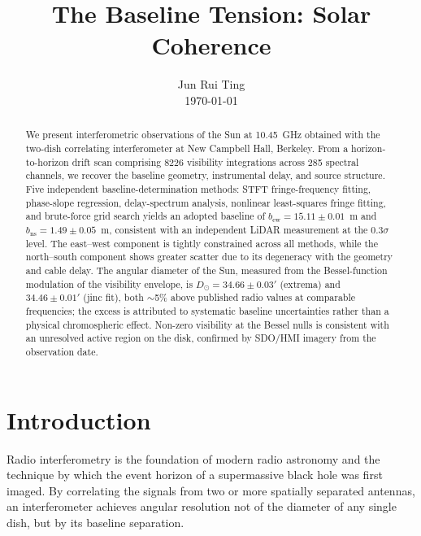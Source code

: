 \documentclass[10pt,preprint2]{aastex}
\begin{document}
\title{The Baseline Tension: Solar Coherence}
\author{Jun Rui Ting \\ \today\vspace{-2.5\baselineskip}}

\begin{abstract}
We present interferometric observations of the Sun at 10.45~GHz obtained with the two-dish correlating interferometer at New Campbell Hall, Berkeley. From a horizon-to-horizon drift scan comprising 8226 visibility integrations across 285 spectral channels, we recover the baseline geometry, instrumental delay, and source structure. Five independent baseline-determination methods: STFT fringe-frequency fitting, phase-slope regression, delay-spectrum analysis, nonlinear least-squares fringe fitting, and brute-force grid search yields an adopted baseline of $b_{\mathrm{ew}} = 15.11 \pm 0.01$~m and $b_{\mathrm{ns}} = 1.49 \pm 0.05$~m, consistent with an independent LiDAR measurement at the $0.3\sigma$ level. The east--west component is tightly constrained across all methods, while the north--south component shows greater scatter due to its degeneracy with the geometry and cable delay. The angular diameter of the Sun, measured from the Bessel-function modulation of the visibility envelope, is $D_\odot = 34.66 \pm 0.03'$ (extrema) and $34.46 \pm 0.01'$ (jinc fit), both $\sim$5\% above published radio values at comparable frequencies; the excess is attributed to systematic baseline uncertainties rather than a physical chromospheric effect. Non-zero visibility at the Bessel nulls is consistent with an unresolved active region on the disk, confirmed by SDO/HMI imagery from the observation date.

\vspace{2.5\baselineskip}
\end{abstract}

\section{Introduction}
\label{sec:intro}

Radio interferometry is the foundation of modern radio astronomy and the technique by which the event horizon of a supermassive black hole was first imaged. By correlating the signals from two or more spatially separated antennas, an interferometer achieves angular resolution not of the diameter of any single dish, but by its baseline separation.
\end{document}

